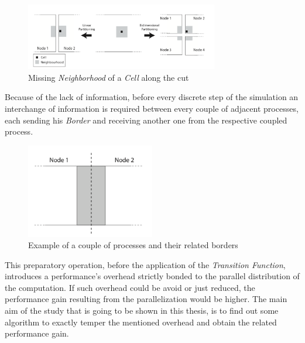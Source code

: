 \documentclass[12pt,a4paper,fleqn]{report}
\begin{document}
\begin{figure}[ht!]
\centering
    \includegraphics[width=0.75\textwidth]{missing_neigh}
    \caption{  Missing \textit{Neighborhood} of a \textit{Cell} along the cut \cite{1}}
\end{figure}

Because of the lack of information, before every discrete step of the simulation an interchange of information is required between every couple of adjacent processes, each sending his \textit{Border} and receiving another one from the respective coupled process. 

\begin{figure}[ht!]
\centering
    \includegraphics[width=0.5\textwidth]{border}
    \caption{  Example of a couple of processes and their related borders \cite{1}}
\end{figure}

This preparatory operation, before the application of the \textit{Transition Function}, introduces a performance's overhead strictly bonded to the parallel distribution of the computation. If such overhead could be avoid or just reduced, the performance gain resulting from the parallelization would be higher. The main aim of the study that is going to be shown in this thesis, is to find out some algorithm to exactly temper the mentioned overhead and obtain the related performance gain. 



\end{document}
